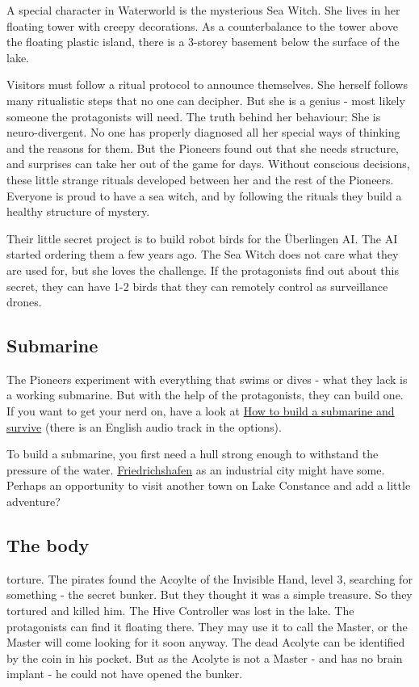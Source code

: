 A special character in Waterworld is the mysterious Sea Witch. She lives in her floating tower with creepy decorations. As a counterbalance to the tower above the floating plastic island, there is a 3-storey basement below the surface of the lake.

Visitors must follow a ritual protocol to announce themselves. She herself follows many ritualistic steps that no one can decipher. But she is a genius - most likely someone the protagonists will need.
The truth behind her behaviour: She is neuro-divergent. No one has properly diagnosed all her special ways of thinking and the reasons for them. But the Pioneers found out that she needs structure, and surprises can take her out of the game for days.
Without conscious decisions, these little strange rituals developed between her and the rest of the Pioneers. Everyone is proud to have a sea witch, and by following the rituals they build a healthy structure of mystery.

Their little secret project is to build robot birds for the Überlingen AI. The AI started ordering them a few years ago. The Sea Witch does not care what they are used for, but she loves the challenge. If the protagonists find out about this secret, they can have 1-2 birds that they can remotely control as surveillance drones.

\subsection{Submarine}

The Pioneers experiment with everything that swims or dives - what they lack is a working submarine. But with the help of the protagonists, they can build one. If you want to get your nerd on, have a look at \href{https://media.ccc.de/v/37c3-11828-how_to_build_a_submarine_and_survive}{How to build a submarine and survive} (there is an English audio track in the options).

To build a submarine, you first need a hull strong enough to withstand the pressure of the water. \hyperref[subsec:Friedrichshafen]{Friedrichshafen} as an industrial city might have some. Perhaps an opportunity to visit another town on Lake Constance and add a little adventure?

\subsection{The body}

torture. The pirates found the Acoylte of the Invisible Hand, level 3, searching for something - the secret bunker. But they thought it was a simple treasure. So they tortured and killed him. The Hive Controller was lost in the lake. The protagonists can find it floating there. They may use it to call the Master, or the Master will come looking for it soon anyway.
The dead Acolyte can be identified by the coin in his pocket. But as the Acolyte is not a Master - and has no brain implant - he could not have opened the bunker.

